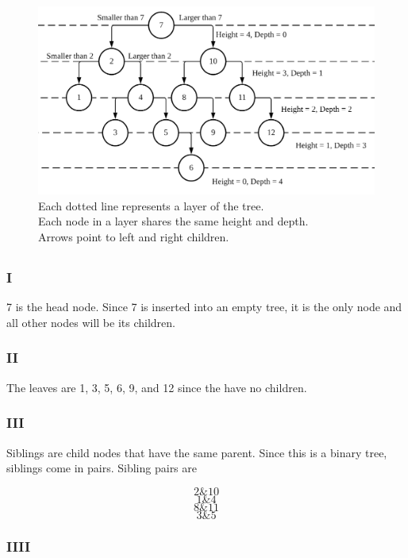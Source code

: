\documentclass[journal]{IEEEtran}
\begin{document}
\begin{figure}[h!]
	\includegraphics[scale = 0.13]{bt.png}
	\caption{Each dotted line represents a layer of the tree. \\ Each node in a layer shares the same height and depth.
             \\ Arrows point to left and right children.}
\end{figure}

\subsection{}

\subsubsection*{I}
7 is the head node. Since 7 is inserted into an empty tree, it is the only node and all 
other nodes will be its children.

\subsubsection*{II}
The leaves are 1, 3, 5, 6, 9, and 12 since the have no children.

\subsubsection*{III}
Siblings are child nodes that have the same parent. Since this is a binary tree, siblings come in pairs. Sibling pairs are

$$2 \& 10$$
$$1 \& 4$$
$$8 \& 11$$
$$3 \& 5$$

\subsubsection*{IIII}
\end{document}
